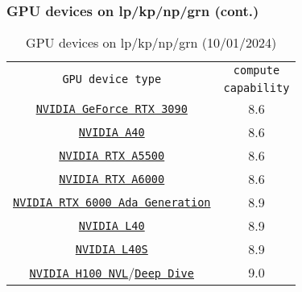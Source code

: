 \begin{frame}
	\frametitle{GPU devices on lp/kp/np/grn (cont.)}
\begin{table}[H]
   \begin{center}
     \begin{tabular}{c|c}
         \multirow{2}{*}{\texttt{GPU device type}} & \texttt{compute} \\
                                                 & \texttt{capability} \\
      \hline
        \href{https://www.nvidia.com/en-us/geforce/graphics-cards/30-series/rtx-3090-3090ti/}{\small{\texttt{NVIDIA GeForce RTX 3090}}} & \small{8.6} \\ 
        \href{https://images.nvidia.com/content/Solutions/data-center/a40/nvidia-a40-datasheet.pdf}{\small{\texttt{NVIDIA A40}}}     & \small{8.6} \\
	     \href{https://www.nvidia.com/content/dam/en-zz/Solutions/gtcs22/design-visualization/quadro-product-literature/proviz-nvidia-rtx-a5500-datasheet-2130578-r3-us-web.pdf}{\small{\texttt{NVIDIA RTX A5500}}} & \small{8.6} \\
	     \href{https://www.nvidia.com/en-us/design-visualization/rtx-a6000/}{\small{\texttt{NVIDIA RTX A6000}}} & \small{8.6} \\
	     \href{https://www.nvidia.com/content/dam/en-zz/Solutions/design-visualization/rtx-6000/proviz-print-rtx6000-datasheet-web-2504660.pdf}{\small{\texttt{NVIDIA RTX 6000 Ada Generation}}}&  \small{8.9} \\
	     \href{https://www.nvidia.com/en-us/data-center/l40/}{\small{\texttt{NVIDIA L40}}} & \small{8.9} \\
	     \href{https://resources.nvidia.com/en-us-l40s/l40s-datasheet-28413}{\small{\texttt{NVIDIA L40S}}} & \small{8.9} \\
	     \href{https://www.nvidia.com/en-us/data-center/h100/}{\small{\texttt{NVIDIA H100 NVL}}}/\href{https://www.nvidia.com/content/dam/en-zz/Solutions/Data-Center/h100/PB-11773-001\_v01.pdf}{\small{\texttt{Deep Dive}}} &  \small{9.0} \\
        \hline
     \end{tabular}
   \end{center}
   \caption{GPU devices on lp/kp/np/grn (10/01/2024)}
\end{table}
\end{frame}

